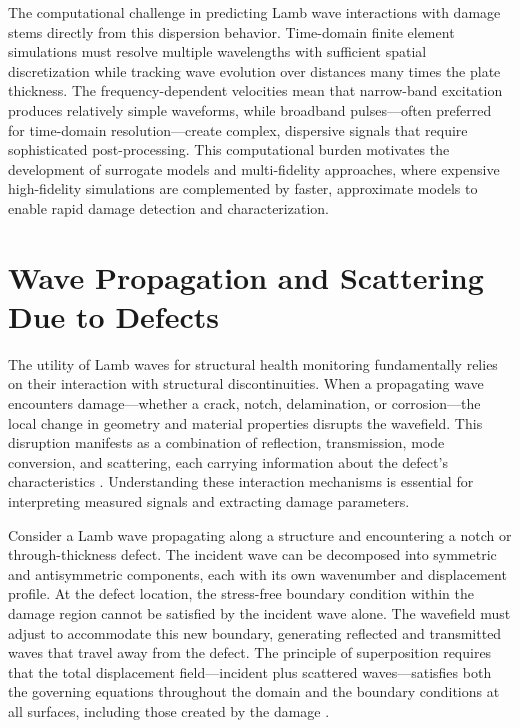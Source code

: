 \documentclass[12pt,a4paper]{report}
\begin{document}
The computational challenge in predicting Lamb wave interactions with damage stems directly from this dispersion behavior. Time-domain finite element simulations must resolve multiple wavelengths with sufficient spatial discretization while tracking wave evolution over distances many times the plate thickness. The frequency-dependent velocities mean that narrow-band excitation produces relatively simple waveforms, while broadband pulses—often preferred for time-domain resolution—create complex, dispersive signals that require sophisticated post-processing. This computational burden motivates the development of surrogate models and multi-fidelity approaches, where expensive high-fidelity simulations are complemented by faster, approximate models to enable rapid damage detection and characterization.

\section{Wave Propagation and Scattering Due to Defects}

The utility of Lamb waves for structural health monitoring fundamentally relies on their interaction with structural discontinuities. When a propagating wave encounters damage—whether a crack, notch, delamination, or corrosion—the local change in geometry and material properties disrupts the wavefield. This disruption manifests as a combination of reflection, transmission, mode conversion, and scattering, each carrying information about the defect's characteristics \citep{rose2014ultrasonic,ahn2021lamb}. Understanding these interaction mechanisms is essential for interpreting measured signals and extracting damage parameters.

Consider a Lamb wave propagating along a structure and encountering a notch or through-thickness defect. The incident wave can be decomposed into symmetric and antisymmetric components, each with its own wavenumber and displacement profile. At the defect location, the stress-free boundary condition within the damage region cannot be satisfied by the incident wave alone. The wavefield must adjust to accommodate this new boundary, generating reflected and transmitted waves that travel away from the defect. The principle of superposition requires that the total displacement field—incident plus scattered waves—satisfies both the governing equations throughout the domain and the boundary conditions at all surfaces, including those created by the damage \citep{ahn2021lamb}.
\end{document}
